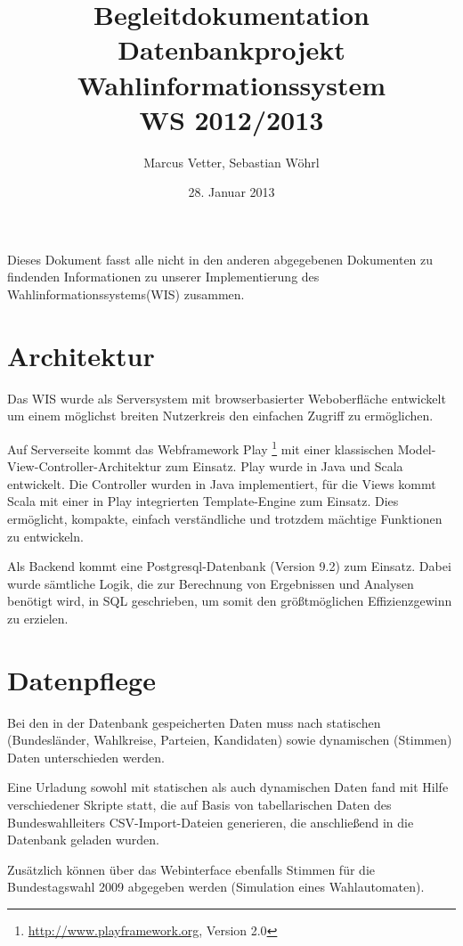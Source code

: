 \documentclass[11pt,a4paper,DIV11,ngerman]{scrartcl}
\begin{document}
\setlength{\parindent}{0ex}

\title{Begleitdokumentation\\ Datenbankprojekt Wahlinformationssystem \\ WS 2012/2013}
\author{Marcus Vetter, Sebastian Wöhrl}
\date{28. Januar 2013}

\maketitle

Dieses Dokument fasst alle nicht in den anderen abgegebenen Dokumenten zu findenden Informationen zu unserer Implementierung des Wahlinformationssystems(WIS) zusammen.

\section{Architektur}
Das WIS wurde als Serversystem mit browserbasierter Weboberfläche entwickelt um einem möglichst breiten Nutzerkreis den einfachen Zugriff zu ermöglichen.

Auf Serverseite kommt das Webframework Play \footnote{\url{http://www.playframework.org}, Version 2.0} mit einer klassischen Model-View-Controller-Architektur zum Einsatz. Play wurde in Java und Scala entwickelt. Die Controller wurden in Java implementiert, für die Views kommt Scala mit einer in Play integrierten Template-Engine zum Einsatz. Dies ermöglicht, kompakte, einfach verständliche und trotzdem mächtige Funktionen zu entwickeln.

Als Backend kommt eine Postgresql-Datenbank (Version 9.2) zum Einsatz. Dabei wurde sämtliche Logik, die zur Berechnung von Ergebnissen und Analysen benötigt wird, in SQL geschrieben, um somit den größtmöglichen Effizienzgewinn zu erzielen.

\section{Datenpflege}
Bei den in der Datenbank gespeicherten Daten muss nach statischen (Bundesländer, Wahlkreise, Parteien, Kandidaten) sowie dynamischen (Stimmen) Daten unterschieden werden.

Eine Urladung sowohl mit statischen als auch dynamischen Daten fand mit Hilfe verschiedener Skripte statt, die auf Basis von tabellarischen Daten des Bundeswahlleiters CSV-Import-Dateien generieren, die anschließend in die Datenbank geladen wurden.

Zusätzlich können über das Webinterface ebenfalls Stimmen für die Bundestagswahl 2009 abgegeben werden (Simulation eines Wahlautomaten).
\end{document}
